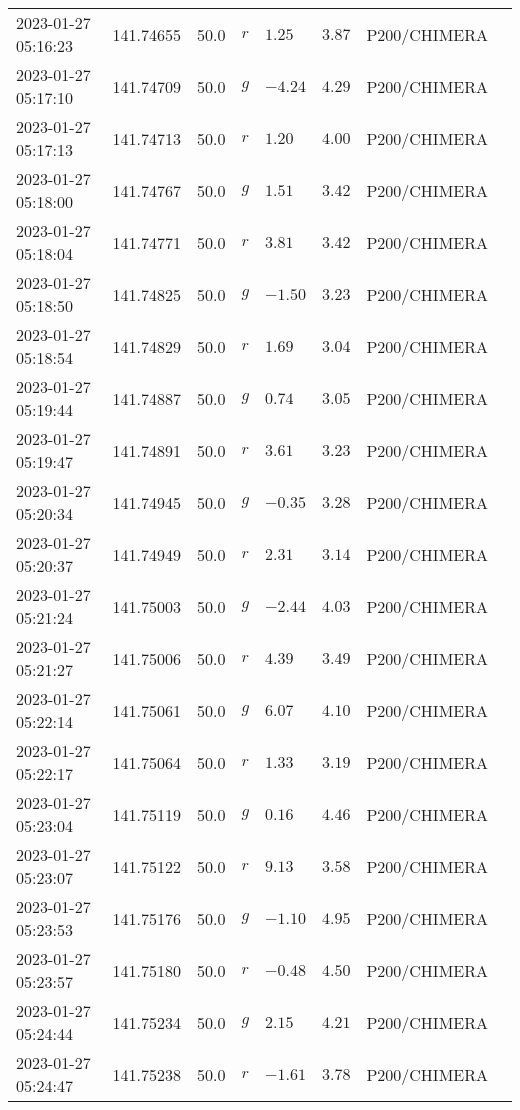 \documentclass{nature_plusfigure}
\begin{document}
\begin{supplement}
\begin{center}
\begin{longtable}{llllllll}
2023-01-27 05:16:23 & 141.74655 & 50.0 & $r$ & $1.25$ & $3.87$ & P200/CHIMERA &  \\ 
2023-01-27 05:17:10 & 141.74709 & 50.0 & $g$ & $-4.24$ & $4.29$ & P200/CHIMERA &  \\ 
2023-01-27 05:17:13 & 141.74713 & 50.0 & $r$ & $1.20$ & $4.00$ & P200/CHIMERA &  \\ 
2023-01-27 05:18:00 & 141.74767 & 50.0 & $g$ & $1.51$ & $3.42$ & P200/CHIMERA &  \\ 
2023-01-27 05:18:04 & 141.74771 & 50.0 & $r$ & $3.81$ & $3.42$ & P200/CHIMERA &  \\ 
2023-01-27 05:18:50 & 141.74825 & 50.0 & $g$ & $-1.50$ & $3.23$ & P200/CHIMERA &  \\ 
2023-01-27 05:18:54 & 141.74829 & 50.0 & $r$ & $1.69$ & $3.04$ & P200/CHIMERA &  \\ 
2023-01-27 05:19:44 & 141.74887 & 50.0 & $g$ & $0.74$ & $3.05$ & P200/CHIMERA &  \\ 
2023-01-27 05:19:47 & 141.74891 & 50.0 & $r$ & $3.61$ & $3.23$ & P200/CHIMERA &  \\ 
2023-01-27 05:20:34 & 141.74945 & 50.0 & $g$ & $-0.35$ & $3.28$ & P200/CHIMERA &  \\ 
2023-01-27 05:20:37 & 141.74949 & 50.0 & $r$ & $2.31$ & $3.14$ & P200/CHIMERA &  \\ 
2023-01-27 05:21:24 & 141.75003 & 50.0 & $g$ & $-2.44$ & $4.03$ & P200/CHIMERA &  \\ 
2023-01-27 05:21:27 & 141.75006 & 50.0 & $r$ & $4.39$ & $3.49$ & P200/CHIMERA &  \\ 
2023-01-27 05:22:14 & 141.75061 & 50.0 & $g$ & $6.07$ & $4.10$ & P200/CHIMERA &  \\ 
2023-01-27 05:22:17 & 141.75064 & 50.0 & $r$ & $1.33$ & $3.19$ & P200/CHIMERA &  \\ 
2023-01-27 05:23:04 & 141.75119 & 50.0 & $g$ & $0.16$ & $4.46$ & P200/CHIMERA &  \\ 
2023-01-27 05:23:07 & 141.75122 & 50.0 & $r$ & $9.13$ & $3.58$ & P200/CHIMERA &  \\ 
2023-01-27 05:23:53 & 141.75176 & 50.0 & $g$ & $-1.10$ & $4.95$ & P200/CHIMERA &  \\ 
2023-01-27 05:23:57 & 141.75180 & 50.0 & $r$ & $-0.48$ & $4.50$ & P200/CHIMERA &  \\ 
2023-01-27 05:24:44 & 141.75234 & 50.0 & $g$ & $2.15$ & $4.21$ & P200/CHIMERA &  \\ 
2023-01-27 05:24:47 & 141.75238 & 50.0 & $r$ & $-1.61$ & $3.78$ & P200/CHIMERA &  \\ 

\end{longtable}
\end{center}
\end{supplement}
\end{document}
